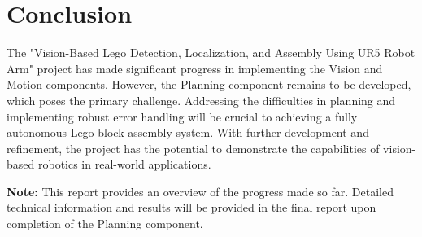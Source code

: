 \documentclass{article}
\begin{document}
	\section{Conclusion}
	The "Vision-Based Lego Detection, Localization, and Assembly Using UR5 Robot Arm" project has made significant progress in implementing the Vision and Motion components. However, the Planning component remains to be developed, which poses the primary challenge. Addressing the difficulties in planning and implementing robust error handling will be crucial to achieving a fully autonomous Lego block assembly system. With further development and refinement, the project has the potential to demonstrate the capabilities of vision-based robotics in real-world applications.
	
	\textbf{Note:} This report provides an overview of the progress made so far. Detailed technical information and results will be provided in the final report upon completion of the Planning component.
	
\end{document}
